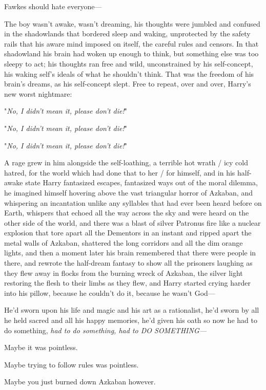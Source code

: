 Fawkes should hate everyone---

The boy wasn't awake, wasn't dreaming, his thoughts were jumbled and confused 
in the shadowlands that bordered sleep and waking, unprotected by the safety 
rails that his aware mind imposed on itself, the careful rules and censors. In 
that shadowland his brain had woken up enough to think, but something else was 
too sleepy to act; his thoughts ran free and wild, unconstrained by his 
self-concept, his waking self's ideals of what he shouldn't think. That was the 
freedom of his brain's dreams, as his self-concept slept. Free to repeat, over 
and over, Harry's new worst nightmare:

"\emph{No, I didn't mean it, please don't die!}"

"\emph{No, I didn't mean it, please don't die!}"

"\emph{No, I didn't mean it, please don't die!}"

A rage grew in him alongside the self-loathing, a terrible hot wrath / icy cold 
hatred, for the world which had done that to her / for himself, and in his 
half-awake state Harry fantasized escapes, fantasized ways out of the moral 
dilemma, he imagined himself hovering above the vast triangular horror of 
Azkaban, and whispering an incantation unlike any syllables that had ever been 
heard before on Earth, whispers that echoed all the way across the sky and were 
heard on the other side of the world, and there was a blast of silver Patronus 
fire like a nuclear explosion that tore apart all the Dementors in an instant 
and ripped apart the metal walls of Azkaban, shattered the long corridors and 
all the dim orange lights, and then a moment later his brain remembered that 
there were people in there, and rewrote the half-dream fantasy to show all the 
prisoners laughing as they flew away in flocks from the burning wreck of 
Azkaban, the silver light restoring the flesh to their limbs as they flew, and 
Harry started crying harder into his pillow, because he couldn't do it, because 
he wasn't God---

He'd sworn upon his life and magic and his art as a rationalist, he'd sworn by 
all he held sacred and all his happy memories, he'd given his oath so now he 
had to do something,\emph{ had to do something, had to DO SOMETHING---}

Maybe it was pointless.

Maybe trying to follow rules was pointless.

Maybe you just burned down Azkaban however.

